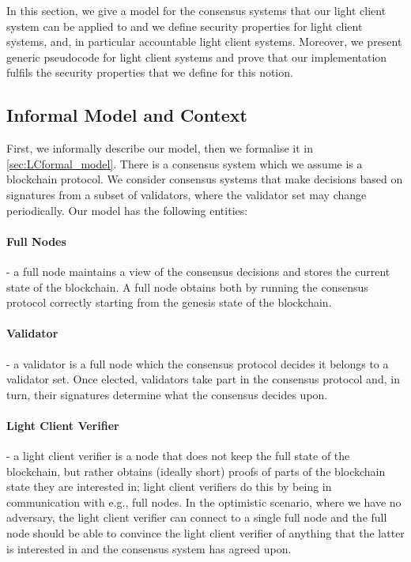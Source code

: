 \label{new_light_client}
In this section, we give a model for the consensus systems that our light client system can be applied to and we define security properties for light client systems,
and, in particular accountable light client systems. Moreover, we present generic pseudocode for light client systems and prove that our implementation 
fulfils the security properties that we define for this notion.  

\subsection{Informal Model and Context}
\label{sec:LCinformal_model}

First, we informally describe our model, then we formalise it in \ref{sec:LCformal_model}.
There is a consensus system which we assume is a blockchain protocol. 
We consider consensus systems that make decisions based on signatures from a subset of validators, where the validator set may change periodically. 
Our model has the following entities: 

\paragraph{Full Nodes} - a full node maintains a view of the consensus decisions and stores the current state of the blockchain. 
A full node obtains both by running the consensus protocol correctly starting from the genesis state of the blockchain.

\paragraph{Validator} - a validator is a full node which the consensus protocol decides it belongs to a validator set. Once elected, 
validators take part in the consensus protocol and, in turn, their signatures determine what the consensus decides upon. 

\paragraph{Light Client Verifier} - a light client verifier is a node that does not keep the full state of the blockchain, but rather obtains (ideally short) proofs 
of parts of the blockchain state they are interested in; light client verifiers do this by being in communication with e.g., full nodes. In the optimistic scenario, 
where we have no adversary, the light client verifier can connect to a single full node and the full node should be able to convince the light client verifier of 
anything that the latter is interested in and the consensus system has agreed upon.


